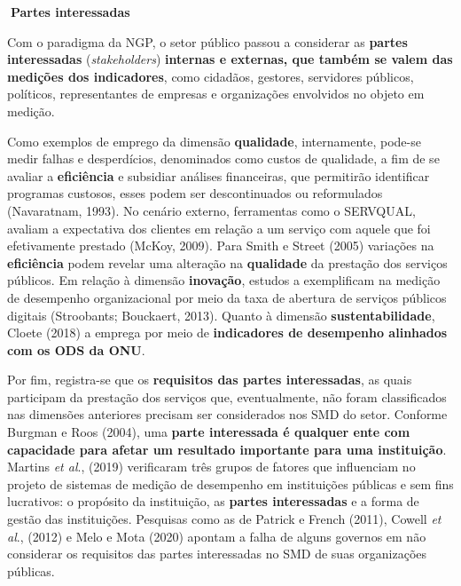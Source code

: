 \documentclass[
  letterpaper,
  DIV=11,
  numbers=noendperiod]{scrreprt}
\begin{document}
\begin{tcolorbox}[enhanced jigsaw, opacityback=0, toprule=.15mm, breakable, leftrule=.75mm, rightrule=.15mm, left=2mm, colback=white, arc=.35mm, bottomrule=.15mm]

\textbf{🔽{Partes interessadas}}\vspace{2mm}

Com o paradigma da NGP, o setor público passou a considerar as
\textbf{partes interessadas} (\emph{stakeholders}) \textbf{internas e
externas, que também se valem das medições dos indicadores}, como
cidadãos, gestores, servidores públicos, políticos, representantes de
empresas e organizações envolvidos no objeto em medição.

\end{tcolorbox}

Como exemplos de emprego da dimensão \textbf{qualidade}, internamente,
pode-se medir falhas e desperdícios, denominados como custos de
qualidade, a fim de se avaliar a \textbf{eficiência} e subsidiar
análises financeiras, que permitirão identificar programas custosos,
esses podem ser descontinuados ou reformulados (Navaratnam, 1993). No
cenário externo, ferramentas como o SERVQUAL, avaliam a expectativa dos
clientes em relação a um serviço com aquele que foi efetivamente
prestado (McKoy, 2009). Para Smith e Street (2005) variações na
\textbf{eficiência} podem revelar uma alteração na \textbf{qualidade} da
prestação dos serviços públicos. Em relação à dimensão
\textbf{inovação}, estudos a exemplificam na medição de desempenho
organizacional por meio da taxa de abertura de serviços públicos
digitais (Stroobants; Bouckaert, 2013). Quanto à dimensão
\textbf{sustentabilidade}, Cloete (2018) a emprega por meio de
\textbf{indicadores de desempenho alinhados com os ODS da ONU}.

Por fim, registra-se que os \textbf{requisitos das partes interessadas},
as quais participam da prestação dos serviços que, eventualmente, não
foram classificados nas dimensões anteriores precisam ser considerados
nos SMD do setor. Conforme Burgman e Roos (2004), uma \textbf{parte
interessada é qualquer ente com capacidade para afetar um resultado
importante para uma instituição}. Martins \emph{et al}., (2019)
verificaram três grupos de fatores que influenciam no projeto de
sistemas de medição de desempenho em instituições públicas e sem fins
lucrativos: o propósito da instituição, as \textbf{partes interessadas}
e a forma de gestão das instituições. Pesquisas como as de Patrick e
French (2011), Cowell \emph{et al}., (2012) e Melo e Mota (2020) apontam
a falha de alguns governos em não considerar os requisitos das partes
interessadas no SMD de suas organizações públicas.
\end{document}
